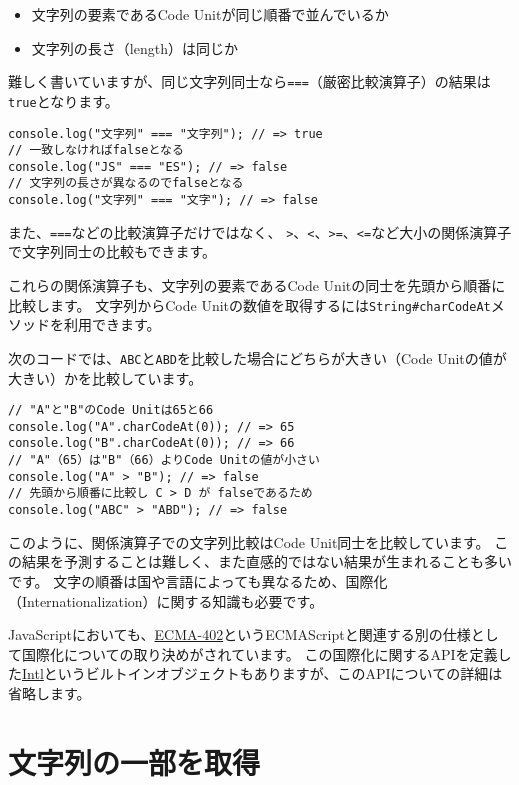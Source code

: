 \begin{itemize}
\item
  文字列の要素であるCode Unitが同じ順番で並んでいるか
\item
  文字列の長さ（length）は同じか
\end{itemize}

難しく書いていますが、同じ文字列同士なら\texttt{===}（厳密比較演算子）の結果は\texttt{true}となります。

\begin{lstlisting}
console.log("文字列" === "文字列"); // => true
// 一致しなければfalseとなる
console.log("JS" === "ES"); // => false
// 文字列の長さが異なるのでfalseとなる
console.log("文字列" === "文字"); // => false
\end{lstlisting}

また、\texttt{===}などの比較演算子だけではなく、
\texttt{>}、\texttt{<}、\texttt{>=}、\texttt{<=}など大小の関係演算子で文字列同士の比較もできます。

これらの関係演算子も、文字列の要素であるCode
Unitの同士を先頭から順番に比較します。 文字列からCode
Unitの数値を取得するには\texttt{String\#charCodeAt}メソッドを利用できます。

次のコードでは、\texttt{ABC}と\texttt{ABD}を比較した場合にどちらが大きい（Code
Unitの値が大きい）かを比較しています。

\begin{lstlisting}
// "A"と"B"のCode Unitは65と66
console.log("A".charCodeAt(0)); // => 65
console.log("B".charCodeAt(0)); // => 66
// "A"（65）は"B"（66）よりCode Unitの値が小さい
console.log("A" > "B"); // => false
// 先頭から順番に比較し C > D が falseであるため
console.log("ABC" > "ABD"); // => false
\end{lstlisting}

このように、関係演算子での文字列比較はCode Unit同士を比較しています。
この結果を予測することは難しく、また直感的ではない結果が生まれることも多いです。
文字の順番は国や言語によっても異なるため、国際化（Internationalization）に関する知識も必要です。

JavaScriptにおいても、\href{https://www.ecma-international.org/publications/standards/Ecma-402.htm}{ECMA-402}というECMAScriptと関連する別の仕様として国際化についての取り決めがされています。
この国際化に関するAPIを定義した\href{https://developer.mozilla.org/ja/docs/Web/JavaScript/Reference/Global_Objects/Intl}{Intl}というビルトインオブジェクトもありますが、このAPIについての詳細は省略します。

\hypertarget{slice}{%
\section{文字列の一部を取得}\label{slice}}

